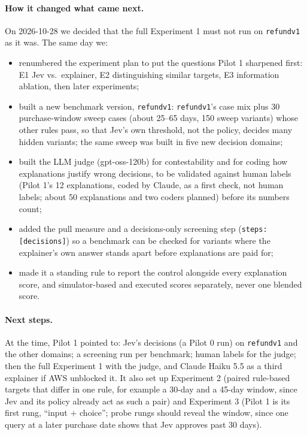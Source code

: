 \documentclass[11pt]{article}
\renewcommand{\_}{\origunderscore\allowbreak}
\begin{document}
\paragraph{How it changed what came next.}
On 2026-10-28 we decided that the full Experiment 1 must not run on \texttt{refund\_v1} as it was. The same day we:
\begin{itemize}[leftmargin=*,itemsep=1pt]
  \item renumbered the experiment plan to put the questions Pilot 1 sharpened first: E1 Jev vs.\ explainer, E2 distinguishing similar targets, E3 information ablation, then later experiments;
  \item built a new benchmark version, \texttt{refund\_v1\_1}: \texttt{refund\_v1}'s case mix plus 30 purchase-window sweep cases (about 25--65 days, 150 sweep variants) whose other rules pass, so that Jev's own threshold, not the policy, decides many hidden variants; the same sweep was built in five new decision domains;
  \item built the LLM judge (gpt-oss-120b) for contestability and for coding how explanations justify wrong decisions, to be validated against human labels (Pilot 1's 12 explanations, coded by Claude, as a first check, not human labels; about 50 explanations and two coders planned) before its numbers count;
  \item added the pull measure and a decisions-only screening step (\texttt{steps: [decisions]}) so a benchmark can be checked for variants where the explainer's own answer stands apart before explanations are paid for;
  \item made it a standing rule to report the control alongside every explanation score, and simulator-based and executed scores separately, never one blended score.
\end{itemize}

\paragraph{Next steps.}
At the time, Pilot 1 pointed to: Jev's decisions (a Pilot 0 run) on \texttt{refund\_v1\_1} and the other domains; a screening run per benchmark; human labels for the judge; then the full Experiment 1 with the judge, and Claude Haiku 5.5 as a third explainer if AWS unblocked it. It also set up Experiment 2 (paired rule-based targets that differ in one rule, for example a 30-day and a 45-day window, since Jev and its policy already act as such a pair) and Experiment 3 (Pilot 1 is its first rung, ``input $+$ choice''; probe rungs should reveal the window, since one query at a later purchase date shows that Jev approves past 30 days).
\end{document}
